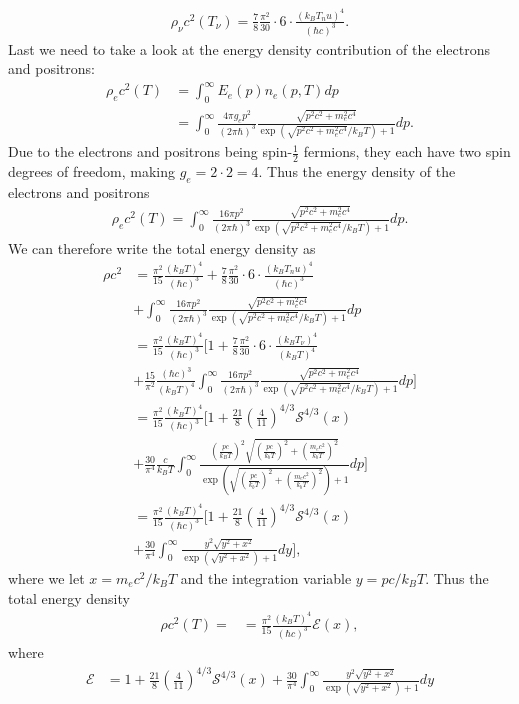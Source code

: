 \documentclass{emulateapj}
\begin{document}
	 \begin{align}
	 	\rho_\nu c^2 (T_\nu) = \frac{7}{8}\frac{\pi^2}{30}\cdot 6\cdot\frac{(k_BT_nu)^4}{(\hbar c)^3}.
	 \end{align}
	 Last we need to take a look at the energy density contribution of the electrons and positrons:
	 \begin{align}
	 	\rho_e c^2(T) &= \int_{0}^{\infty}E_e(p)n_e(p,T)dp\\
	 	& = \int_{0}^{\infty}\frac{4\pi g_e p^2}{(2\pi\hbar)^3}\frac{\sqrt{p^2c^2 + m_e^2c^4}}{\exp(\sqrt{p^2c^2 + m_e^2c^4}/k_BT) + 1}dp.
	 \end{align}
	 Due to the electrons and positrons being spin-$\frac{1}{2}$ fermions, they each have two spin degrees of freedom, making $g_e = 2\cdot2 = 4$. Thus the energy density of the electrons and positrons
	 \begin{align}
	 	\rho_e c^2(T) = \int_{0}^{\infty}\frac{16\pi p^2}{(2\pi\hbar)^3}\frac{\sqrt{p^2c^2 + m_e^2c^4}}{\exp(\sqrt{p^2c^2 + m_e^2c^4}/k_BT) + 1}dp.
	 \end{align}
	 We can therefore write the total energy density as 
	 \begin{align}
	 	\rho c^2 &= \frac{\pi^2}{15}\frac{(k_BT)^4}{(\hbar c)^3} + \frac{7}{8}\frac{\pi^2}{30}\cdot 6\cdot\frac{(k_BT_nu)^4}{(\hbar c)^3}\\
	 	&+\int_{0}^{\infty}\frac{16\pi p^2}{(2\pi\hbar)^3}\frac{\sqrt{p^2c^2 + m_e^2c^4}}{\exp(\sqrt{p^2c^2 + m_e^2c^4}/k_BT) + 1}dp\\
	 	&= \frac{\pi^2}{15}\frac{(k_BT)^4}{(\hbar c)^3}\Bigg[1 + \frac{7}{8}\frac{\pi^2}{30}\cdot6\cdot\frac{(k_BT_\nu)^4}{(k_BT)^4}\\
	 	&+ \frac{15}{\pi^2}\frac{(\hbar c)^3}{(k_BT)^4}\int_{0}^{\infty}\frac{16\pi p^2}{(2\pi\hbar)^3}\frac{\sqrt{p^2c^2 + m_e^2c^4}}{\exp(\sqrt{p^2c^2 + m_e^2c^4}/k_BT) + 1}dp\Bigg]\\
	 	&= \frac{\pi^2}{15}\frac{(k_BT)^4}{(\hbar c)^3}\Bigg[1 + \frac{21}{8}\left(\frac{4}{11}\right)^{4/3}\mathcal{S}^{4/3}(x)\\
	 	&+ \frac{30}{\pi^4}\frac{c}{k_BT}\int_{0}^{\infty}\frac{\left(\frac{pc}{k_BT}\right)^2\sqrt{\left(\frac{pc}{k_bT}\right)^2 + \left(\frac{m_ec^2}{k_bT}\right)^2}}{\exp(\sqrt{\left(\frac{pc}{k_bT}\right)^2 + \left(\frac{m_ec^2}{k_bT}\right)^2}) + 1}dp\Bigg]\\
	 	& = \frac{\pi^2}{15}\frac{(k_BT)^4}{(\hbar c)^3}\Bigg[1 + \frac{21}{8}\left(\frac{4}{11}\right)^{4/3}\mathcal{S}^{4/3}(x)\\
	 	&+ \frac{30}{\pi^4}\int_{0}^{\infty}\frac{y^2\sqrt{y^2 + x^2}}{\exp(\sqrt{y^2 + x^2}) + 1}dy\Bigg],
	 \end{align}
	 where we let $x = m_ec^2/k_BT$ and the integration variable $y = pc/k_BT$.
	 Thus the total energy density 
	 \begin{align}
	 	\rho c^2(T) = & = \frac{\pi^2}{15}\frac{(k_BT)^4}{(\hbar c)^3}\mathcal{E}(x),
	 \end{align}
	 where 
	 \begin{align}
	 	\mathcal{E} &= 1 + \frac{21}{8}\left(\frac{4}{11}\right)^{4/3}\mathcal{S}^{4/3}(x) + \frac{30}{\pi^4}\int_{0}^{\infty}\frac{y^2\sqrt{y^2 + x^2}}{\exp(\sqrt{y^2 + x^2}) + 1}dy 
	 \end{align}
\end{document}
